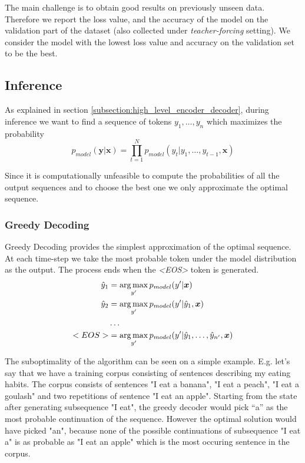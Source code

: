 The main challenge is to obtain good results on previously unseen data. Therefore we report the loss value, and the accuracy of the model on the validation part of the dataset (also collected under \emph{teacher-forcing} setting). We consider the model with the lowest loss value and accuracy on the validation set to be the best.

\subsection{Inference} \label{section:inference}

As explained in section \ref{subsection:high_level_encoder_decoder}, during inference we want to find a sequence of tokens $y_1,\dots,y_n$ which maximizes the probability
\begin{equation}
    p_{model}(\boldsymbol{y} | \boldsymbol{x}) = \prod_{t=1}^N{p_{model}(y_t|y_1,\dots,y_{t-1}, \boldsymbol{x})}
\end{equation}

Since it is computationally  unfeasible to compute the probabilities of all the output sequences and to choose the best one we only approximate the optimal sequence.

\subsubsection{Greedy Decoding}

Greedy Decoding provides the simplest approximation of the optimal sequence. At each time-step we take the most probable token under the model distribution as the output. The process ends when the \emph{\textless EOS\textgreater} token is generated.
\begin{align*}
    \hat{y}_1 &= \operatorname*{arg\,max}_{y'}{p_{model}(y' | \boldsymbol{x})} \\
    \hat{y}_2 &= \operatorname*{arg\,max}_{y'}{p_{model}(y' | \hat{y}_1, \boldsymbol{x})} \\
    &\dots \\
    <EOS> &= \operatorname*{arg\,max}_{y'}{p_{model}(y' | \hat{y}_1,\dots,\hat{y}_{n'}, \boldsymbol{x})}
\end{align*}

The suboptimality of the algorithm can be seen on a simple example. E.g. let's say that we have a training corpus consisting of sentences describing my eating habits. The corpus consists of sentences "I eat a banana", "I eat a peach", "I eat a goulash" and two repetitions of sentence "I eat an apple". Starting from the state after generating subsequence "I eat", the greedy decoder would pick ``a'' as the most probable continuation of the sequence. However the optimal solution would have picked "an", because none of the possible continuations of subsequence "I eat a" is as probable as "I eat an apple" which is the most occuring sentence in the corpus.

